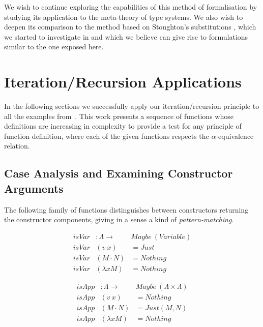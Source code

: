 \documentclass{entcs}
\newcommand{\alp}{\ensuremath{\alpha}}
\begin{document}
We wish to continue exploring the capabilities of this method of formalisation by studying its application to the meta-theory of type systems. We also wish to deepen its comparison to the method  based on Stoughton's substitutions \cite{stoughton}, which we started to investigate in \cite{nos} and which we believe can give rise to formulations similar to the one exposed here.

\appendix

\section{Iteration/Recursion Applications}
\label{sec:applications}

In the following sections we successfully apply our iteration/recursion principle to all the examples from~\cite{Norrish04recursivefunction}. This work presents a sequence of functions whose definitions are increasing in complexity to provide a test for any principle of function definition, where each of the given functions respects the \alp-equivalence relation.

\subsection{Case Analysis and Examining Constructor Arguments}
\label{sec:caseanalysis}

The following family of functions distinguishes between constructors returning the constructor components, giving in a sense a kind of \emph{pattern-matching}.

\begin{minipage}{.5\textwidth}
\[\begin{array}{rll}
isVar &: \Lambda \rightarrow& Maybe\ ( Variable ) \\
isVar &(v\ x)         &= Just \\
isVar &(M \cdot N)   &= Nothing \\
isVar &(\lambda x M) &= Nothing
\end{array}\]
\end{minipage}
\begin{minipage}{.5\textwidth}
\[\begin{array}{rll}
isApp &: \Lambda \rightarrow& Maybe\ (\Lambda \times \Lambda) \\
isApp &(v\ x)          &= Nothing \\
isApp &(M \cdot N)   &= Just (M , N) \\
isApp &(\lambda x M) &= Nothing
\end{array}\]
\end{minipage}
\end{document}
